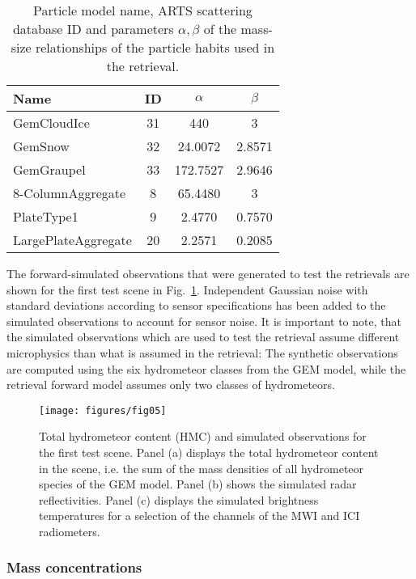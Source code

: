\documentclass[journal abbreviation, manuscript]{copernicus}
\begin{document}
\begin{table}
  \centering
  \caption{Particle model name, ARTS scattering database ID and parameters
    $\alpha, \beta$ of the mass-size relationships of the particle habits used
    in the retrieval.}
  \begin{tabular}{l|c|c|c}
    Name & ID & $\alpha$ & $\beta$ \\
    \hline
    GemCloudIce         & 31  & 440      & 3 \\
    GemSnow             & 32  & 24.0072  & 2.8571 \\
    GemGraupel          & 33  & 172.7527 & 2.9646 \\
    8-ColumnAggregate   &  8  & 65.4480  & 3      \\
    PlateType1          &  9  & 2.4770   & 0.7570 \\
    LargePlateAggregate &  20 & 2.2571   & 0.2085 \\
  \end{tabular}
  \label{tab:particles_retrieval}
\end{table}

The forward-simulated observations that were generated to test the retrievals
are shown for the first test scene in Fig.~\ref{fig:observations_a}. Independent
Gaussian noise with standard deviations according to sensor specifications has
been added to the simulated observations to account for sensor noise. It is
important to note, that the simulated observations which are used to test the
retrieval assume different microphysics than what is assumed in the retrieval:
The synthetic observations are computed using the six hydrometeor classes from
the GEM model, while the retrieval forward model assumes only two classes of
hydrometeors.

\begin{figure}
\centering
\texttt{[image: figures/fig05]}
\caption{Total hydrometeor content (HMC) and simulated observations for the first test
  scene. Panel (a) displays the total hydrometeor content in the scene, i.e. the
  sum of the mass densities of all hydrometeor species of the GEM model. Panel
  (b) shows the simulated radar reflectivities. Panel (c) displays the simulated
  brightness temperatures for a selection of the channels of the MWI and ICI
  radiometers.}
\label{fig:observations_a}
\end{figure}

\subsubsection{Mass concentrations}
\end{document}

